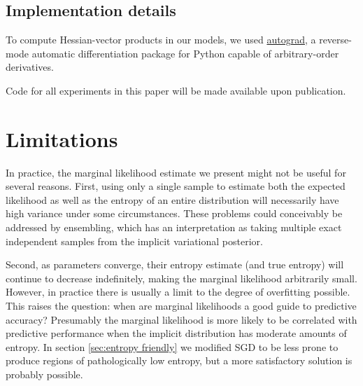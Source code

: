 \documentclass[]{article}
\begin{document}
\subsection{Implementation details}
To compute Hessian-vector products in our models, we used \href{http://github.com/HIPS/autograd}{autograd},
a reverse-mode automatic differentiation package for Python capable of arbitrary-order derivatives.

Code for all experiments in this paper will be made available upon publication.

\section{Limitations}
\label{sec:limitations}
In practice, the marginal likelihood estimate we present might not be useful for several reasons.
First, using only a single sample to estimate both the expected likelihood as well as the entropy of an entire distribution will necessarily have high variance under some circumstances.
These problems could conceivably be addressed by ensembling, which has an interpretation as taking multiple exact independent samples from the implicit variational posterior.

Second, as parameters converge, their entropy estimate (and true entropy) will continue to decrease indefinitely, making the marginal likelihood arbitrarily small.
However, in practice there is usually a limit to the degree of overfitting possible.
This raises the question: when are marginal likelihoods a good guide to predictive accuracy?
Presumably the marginal likelihood is more likely to be correlated with predictive performance when the
implicit distribution has moderate amounts of entropy.
In section \ref{sec:entropy friendly} we modified SGD to be less prone to produce regions of pathologically low entropy, but a more satisfactory solution is probably possible.
\end{document}
